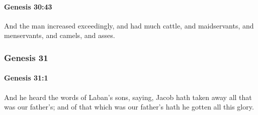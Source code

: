 		\paragraph{Genesis 30:43} %
			\label{GENESIS-30-43}

			And the man increased exceedingly, and had much cattle, and maidservants, and menservants, and camels, and asses.

	\subsubsection{Genesis 31} %
		\label{GENESIS-31}

		\paragraph{Genesis 31:1} %
			\label{GENESIS-31-1}

			And he heard the words of Laban's sons, saying, Jacob hath taken away all that was our father's; and of that which was our father's hath he gotten all this glory.


